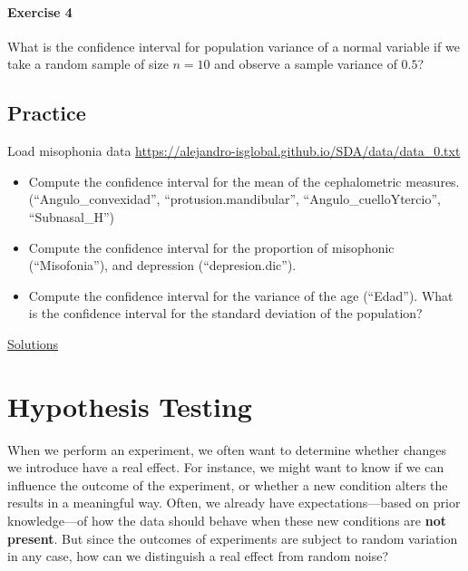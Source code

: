 \documentclass[
]{book}
\begin{document}
\hypertarget{exercise-4-6}{%
\subsubsection{Exercise 4}\label{exercise-4-6}}

What is the confidence interval for population variance of a normal variable if we take a random sample of size \(n=10\) and observe a sample variance of \(0.5\)?

\hypertarget{practice-3}{%
\section{Practice}\label{practice-3}}

Load misophonia data \url{https://alejandro-isglobal.github.io/SDA/data/data_0.txt}

\begin{itemize}
\item
  Compute the confidence interval for the mean of the cephalometric measures. (``Angulo\_convexidad'', ``protusion.mandibular'', ``Angulo\_cuelloYtercio'', ``Subnasal\_H'')
\item
  Compute the confidence interval for the proportion of misophonic (``Misofonia''), and depression (``depresion.dic'').
\item
  Compute the confidence interval for the variance of the age (``Edad''). What is the confidence interval for the standard deviation of the population?
\end{itemize}

\href{https://colab.research.google.com/drive/13El5aoycT_6Wasvyx427TvglygiSPMpF?usp=sharing}{Solutions}

\hypertarget{hypothesis-testing}{%
\chapter{Hypothesis Testing}\label{hypothesis-testing}}

When we perform an experiment, we often want to determine whether changes we introduce have a real effect. For instance, we might want to know if we can influence the outcome of the experiment, or whether a new condition alters the results in a meaningful way. Often, we already have expectations---based on prior knowledge---of how the data should behave when these new conditions are \textbf{not present}. But since the outcomes of experiments are subject to random variation in any case, how can we distinguish a real effect from random noise?
\end{document}
